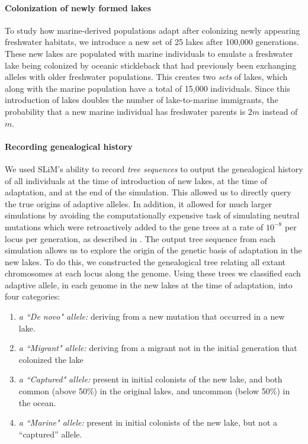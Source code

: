 \documentclass{article}
\begin{document}
\paragraph{Colonization of newly formed lakes} 

To study how marine-derived populations adapt after colonizing newly appearing freshwater habitats, we introduce a new set of 25 lakes after 100,000 generations. 
These new lakes are populated with marine individuals to emulate a freshwater lake being colonized by oceanic stickleback that had previously been exchanging alleles with older freshwater populations. 
This creates two \emph{sets} of lakes, which along with the marine population have a total of 15,000 individuals. Since this introduction of lakes doubles the number of lake-to-marine immigrants, the probability that a new marine individual has freshwater parents is $2m$ instead of $m$.

\paragraph{Recording genealogical history}

We used SLiM's ability to record \emph{tree sequences} \citep{haller2018treesequence,Kelleher2016} to output the genealogical history of all individuals at the time of introduction of new lakes, at the time of adaptation, and at the end of the simulation. This allowed us to directly query the true origins of adaptive alleles. 
In addition, it allowed for much larger simulations by avoiding the computationally expensive task of simulating neutral mutations which were retroactively added to the gene trees at a rate of $10^{-8}$ per locus per generation, as described in \citet{kelleher2018efficient}.
The output tree sequence from each simulation allows us to explore the origin of the genetic basis of adaptation in the new lakes. 
To do this, we constructed the genealogical tree relating all extant chromosomes at each locus along the genome. 
Using these trees we classified each adaptive allele, in each genome in the new lakes at the time of adaptation, into four categories:

\begin{enumerate}
    \item \emph{a ``De novo" allele:}
        deriving from a new mutation that occurred in a new lake.
    \item \emph{a ``Migrant" allele:} 
        deriving from a migrant not in the initial generation that colonized the lake
    \item \emph{a ``Captured" allele:}
        present in initial colonists of the new lake, 
        and both common (above 50\%) in the original lakes,
        and uncommon (below 50\%) in the ocean.
    \item \emph{a ``Marine" allele:} 
        present in initial colonists of the new lake, 
        but not a ``captured'' allele.
\end{enumerate}
\end{document}
